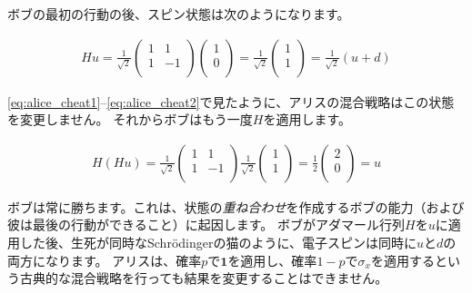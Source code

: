 ボブの最初の行動の後、スピン状態は次のようになります。

\begin{align}
Hu = \frac{1}{\sqrt{2}}
\begin{pmatrix}
1 & 1 \\
1 & -1 \\
\end{pmatrix}
\begin{pmatrix}
1  \\
0  \\
\end{pmatrix}
=
\frac{1}{\sqrt{2}}
\begin{pmatrix}
1  \\
1  \\
\end{pmatrix}
=
\frac{1}{\sqrt{2}}(u + d)
\end{align}

\autoref{eq:alice_cheat1}--\ref{eq:alice_cheat2}で見たように、アリスの混合戦略はこの状態を変更しません。
それからボブはもう一度$H$を適用します。

\begin{align}
H(Hu) = \frac{1}{\sqrt{2}}
\begin{pmatrix}
1 & 1 \\
1 & -1 \\
\end{pmatrix}
\frac{1}{\sqrt{2}}
\begin{pmatrix}
1  \\
1  \\
\end{pmatrix}
=
\frac{1}{2}
\begin{pmatrix}
2  \\
0  \\
\end{pmatrix}
= u
\end{align}

ボブは常に勝ちます。これは、状態の\emph{重ね合わせ}を作成するボブの能力（および彼は最後の行動ができること）に起因します。
ボブがアダマール行列$H$を$u$に適用した後、生死が同時なSchrödingerの猫のように、電子スピンは同時に$u$と$d$の両方になります。
アリスは、確率$p$で$\textbf{1}$を適用し、確率$1-p$で$\sigma_x$を適用するという古典的な混合戦略を行っても結果を変更することはできません。
